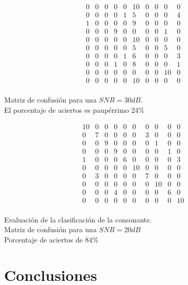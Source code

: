 \documentclass[conference,a4paper,10pt,oneside,final]{tfmpd}
\begin{document}
	\begin{table}
	\[
		\begin{array}{cccccccccc}
0 & 0 & 0 & 0 & 0 & 10 & 0 & 0 & 0 & 0 \\
0 & 0 & 0 & 0 & 1 & 5 & 0 & 0 & 0 & 4 \\
1 & 0 & 0 & 0 & 0 & 9 & 0 & 0 & 0 & 0 \\
0 & 0 & 0 & 9 & 0 & 0 & 0 & 0 & 1 & 0 \\
0 & 0 & 0 & 0 & 0 & 10 & 0 & 0 & 0 & 0 \\
0 & 0 & 0 & 0 & 0 & 5 & 0 & 0 & 5 & 0 \\
0 & 0 & 0 & 0 & 1 & 6 & 0 & 0 & 0 & 3 \\
0 & 0 & 0 & 1 & 0 & 8 & 0 & 0 & 0 & 1 \\
0 & 0 & 0 & 0 & 0 & 0 & 0 & 0 & 10 & 0 \\
0 & 0 & 0 & 0 & 0 & 10 & 0 & 0 & 0 & 0 \\
		\end{array}
	\]
		\caption{Matriz de confusión para una $SNR=30dB$. \\
		El porcentaje de aciertos es paupérrimo $24\%$}
	\end{table}

	\begin{table}
	\[
		\begin{array}{cccccccccc}
10 & 0 & 0 & 0 & 0 & 0 & 0 & 0 & 0 & 0 \\
0 & 7 & 0 & 0 & 0 & 0 & 3 & 0 & 0 & 0 \\
0 & 0 & 9 & 0 & 0 & 0 & 0 & 1 & 0 & 0 \\
0 & 0 & 0 & 9 & 0 & 0 & 0 & 0 & 1 & 0 \\
1 & 0 & 0 & 0 & 6 & 0 & 0 & 0 & 0 & 3 \\
0 & 0 & 0 & 0 & 0 & 10 & 0 & 0 & 0 & 0 \\
0 & 3 & 0 & 0 & 0 & 0 & 7 & 0 & 0 & 0 \\
0 & 0 & 0 & 0 & 0 & 0 & 0 & 10 & 0 & 0 \\
0 & 0 & 0 & 4 & 0 & 0 & 0 & 0 & 6 & 0 \\
0 & 0 & 0 & 0 & 0 & 0 & 0 & 0 & 0 & 10 \\
		\end{array}
	\]
		\caption{Evaluación de la clasificación de la consonante. \\
		Matriz de confusión para una $SNR=20dB$ \\
		Porcentaje de aciertos de $84\%$}
	\end{table}
	
\section{Conclusiones}
\end{document}
